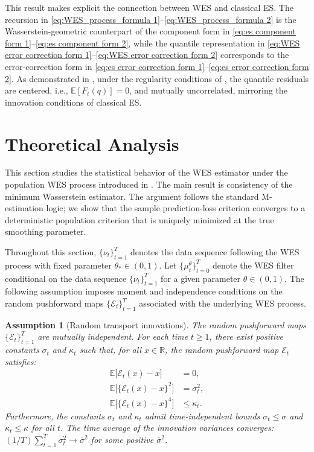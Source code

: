 \documentclass[a4paper, 11pt]{article}
\newcommand{\R}{\mathbb{R}}
\newcommand{\E}{\mathbb E}
\newcommand{\T}{\mathcal E}
\newtheorem{assumption}{Assumption}
\theoremstyle{definition}
\begin{document}
This result makes explicit the connection between WES and classical ES.
The recursion in \eqref{eq:WES_process_formula 1}--\eqref{eq:WES_process_formula 2} is the Wasserstein-geometric counterpart of the component form in \eqref{eq:es component form 1}--\eqref{eq:es component form 2}, while the quantile representation in \eqref{eq:WES error correction form 1}--\eqref{eq:WES error correction form 2} corresponds to the error-correction form in \eqref{eq:es error correction form 1}--\eqref{eq:es error correction form 2}.
As demonstrated in , under the regularity conditions of , the quantile residuals are centered, i.e., $\E[F_{t}(q)]=0$, and mutually uncorrelated, mirroring the innovation conditions of classical ES.




\section{Theoretical Analysis} \label{sec:theory}

This section studies the statistical behavior of the WES estimator under the population WES process introduced in . 
The main result is consistency of the minimum Wasserstein estimator. 
The argument follows the standard M-estimation logic; we show that the sample prediction-loss criterion converges to a deterministic population criterion that is uniquely minimized at the true smoothing parameter.

Throughout this section, $\{ \nu_t \}_{t=1}^{T}$ denotes the data sequence following the WES process with fixed parameter $\theta_* \in (0, 1)$.
Let $\{ \mu_t^\theta \}_{t=0}^{T}$ denote the WES filter conditional on the data sequence $\{ \nu_t \}_{t=1}^{T}$ for a given parameter $\theta \in (0, 1)$.
The following assumption imposes moment and independence conditions on the random pushforward maps $\{ \T_t \}_{t=1}^{T}$ associated with the underlying WES process.

\begin{assumption}[Random transport innovations] \label{ass:transport_innovations}
The random pushforward maps $\{ \T_t \}_{t=1}^{T}$ are mutually independent.
For each time $t \ge 1$, there exist positive constants $\sigma_t$ and $\kappa_t$ such that, for all $x\in \R$, the random pushforward map $\T_t$ satisfies:
\begin{align}
    \E\big[ \T_t(x)-x \big] &= 0, \\
    \E\big[ \{ \T_t(x)-x \}^2 \big] &= \sigma_t^2, \\
    \E\big[ \{ \T_t(x)-x \}^4 \big] &\leq \kappa_t .
\end{align}
Furthermore, the constants $\sigma_t$ and $\kappa_t$ admit time-independent bounds $\sigma_t \leq \sigma$ and $\kappa_t \leq \kappa$ for all $t$.
The time average of the innovation variances converges: $(1 / T) \sum_{t=1}^{T}\sigma_t^2 \to \bar{\sigma}^2$ for some positive $\bar{\sigma}^2$.
\end{assumption}
\end{document}
